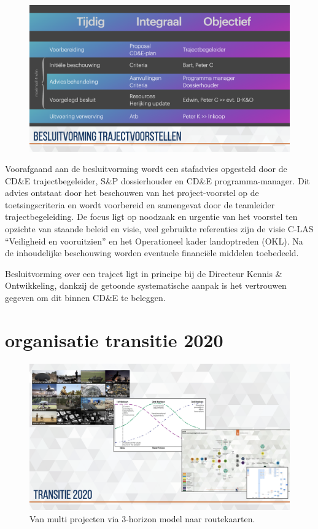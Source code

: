 \documentclass[
]{book}
\begin{document}
\begin{figure}

{\centering \includegraphics[width=0.5\linewidth]{data/keynote-slides/20200430-CDE-Designprocess/20200430-CDE-Designprocess.037} 

}

\caption{ }\label{fig:unnamed-chunk-26}
\end{figure}

Voorafgaand aan de besluitvorming wordt een stafadvies opgesteld door de CD\&E trajectbegeleider, S\&P dossierhouder en CD\&E programma-manager. Dit advies ontstaat door het beschouwen van het project-voorstel op de toetsingscriteria en wordt voorbereid en samengevat door de teamleider trajectbegeleiding. De focus ligt op noodzaak en urgentie van het voorstel ten opzichte van staande beleid en visie, veel gebruikte referenties zijn de visie C-LAS ``Veiligheid en vooruitzien'' en het Operationeel kader landoptreden (OKL). Na de inhoudelijke beschouwing worden eventuele financiële middelen toebedeeld.

Besluitvorming over een traject ligt in principe bij de Directeur Kennis \& Ontwikkeling, dankzij de getoonde systematische aanpak is het vertrouwen gegeven om dit binnen CD\&E te beleggen.

\hypertarget{organisatie-transitie-2020}{%
\section{organisatie transitie 2020}\label{organisatie-transitie-2020}}

\begin{figure}

{\centering \includegraphics[width=0.5\linewidth]{data/keynote-slides/20200430-CDE-Designprocess/20200430-CDE-Designprocess.009-3} 

}

\caption{Van multi projecten via 3-horizon model naar routekaarten.}\label{fig:unnamed-chunk-27}
\end{figure}
\end{document}

